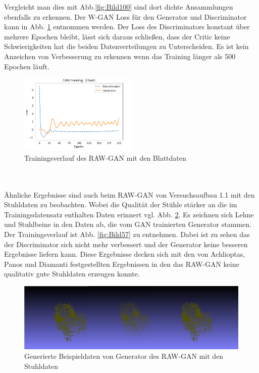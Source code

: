 \documentclass{llncs}
\begin{document}
Vergleicht man dies mit Abb.\ref{fig:Bild100} sind dort dichte Ansammlungen ebenfalls zu erkennen. Der W-GAN Loss für den Generator und Discriminator kann in Abb. \ref{fig:Bild1002} entnommen werden. Der Loss des Discriminators konstant über mehrere Epochen bleibt, lässt sich daraus schließen, dass der Critic keine Schwierigkeiten hat die beiden Datenverteilungen zu Unterscheiden. Es ist kein Anzeichen von Verbesserung zu erkennen wenn das Training länger als 500 Epochen läuft. 
\begin{figure}[htbp]
	\centering
	\includegraphics[width=0.5\textwidth]{raw_gan_leaf_result.png}
	\caption{Trainingsverlauf des RAW-GAN mit den Blattdaten}
	\label{fig:Bild1002}
\end{figure}
~\\\\
Ähnliche Ergebnisse sind auch beim RAW-GAN von Versuchsaufbau 1.1 mit den Stuhldaten zu beobachten. Wobei die Qualität der Stühle stärker an die im Trainingsdatensatz enthalten Daten erinnert vgl. Abb. \ref{fig:Bild58}. Es zeichnen sich Lehne und Stuhlbeine in den Daten ab, die vom GAN trainierten Generator stammen. Der Trainingsverlauf ist Abb. \ref{fig:Bild57} zu entnehmen. Dabei ist zu sehen das der Discriminator sich nicht mehr verbessert und der Generator keine besseren Ergebnisse liefern kann. Diese Ergebnisse decken sich mit den von Achlioptas, Panos und Diamanti \cite{3dgan} festgestellten Ergebnissen in den das RAW-GAN keine qualitativ gute Stuhldaten erzeugen konnte. 
\begin{figure}[htbp] 
	\centering
	\includegraphics[width=1.0\textwidth]{raw_gan_chair_example.png}
	\caption{Generierte Beispieldaten von Generator des RAW-GAN mit den Stuhldaten}
	\label{fig:Bild58}
	\end{figure}
\end{document}
